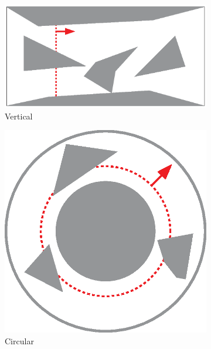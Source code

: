 \begin{figure}[t]
    \begin{subfigure}[t]{0.23\textwidth}
         \centering
         \includegraphics[width=\textwidth]{chapters/sc/fig/vertical.eps}
         \caption{Vertical}
         \label{fig:vertical}
     \end{subfigure}
    \begin{subfigure}[t]{0.115\textwidth}
         \centering
         \includegraphics[width=\textwidth]{chapters/sc/fig/circular.eps}
         \caption{Circular}
         \label{fig:radial}
     \end{subfigure}
    \begin{subfigure}[t]{0.115\textwidth}

\end{subfigure}
\end{figure}
